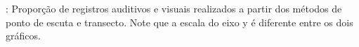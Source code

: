 \label{fig:aves1}: Proporção de registros auditivos e visuais realizados a partir dos métodos de ponto de escuta e transecto.
 Note que a escala do eixo y é diferente entre os dois gráficos.
